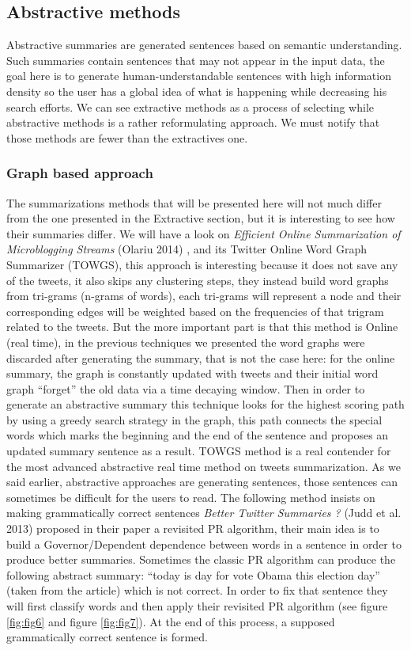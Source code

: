 \documentclass{llncs}
\begin{document}
\subsection{Abstractive methods}

Abstractive summaries are generated sentences based on semantic understanding.
Such summaries contain sentences that may not appear in the input data, the
goal here is to generate human-understandable sentences with high information
density so the user has a global idea of what is happening while decreasing his
search efforts. We can see extractive methods as a process of selecting while
abstractive methods is a rather reformulating approach. We must notify that
those methods are fewer than the extractives one.

\subsubsection{Graph based approach}

The summarizations methods that will be presented here will not much differ
from the one presented in the Extractive section, but it is interesting to see
how their summaries differ. We will have a look on \textit{Efficient Online
Summarization of Microblogging Streams} (Olariu 2014)
\cite{olariu_efficient_2014}, and its Twitter Online Word Graph Summarizer
(TOWGS), this approach is interesting because it does not save any of the
tweets, it also skips any clustering steps, they instead build word graphs from
tri-grams (n-grams of words), each tri-grams will represent a node and their
corresponding edges will be weighted based on the frequencies of that trigram
related to the tweets. But the more important part is that this method is
Online (real time), in the previous techniques we presented the word graphs
were discarded after generating the summary, that is not the case here: for the
online summary, the graph is constantly updated with tweets and their initial
word graph ``forget'' the old data via a time decaying window. Then in order to
generate an abstractive summary this technique looks for the highest scoring
path by using a greedy search strategy in the graph, this path connects the
special words which marks the beginning and the end of the sentence and
proposes an updated summary sentence as a result. TOWGS method is a real
contender for the most advanced abstractive real time method on tweets
summarization. As we said earlier, abstractive approaches are generating
sentences, those sentences can sometimes be difficult for the users to read.
The following method insists on making grammatically correct sentences
\textit{Better Twitter Summaries ?} (Judd et al. 2013) \cite{judd_better_2013}
proposed in their paper a revisited PR algorithm, their main idea is to build a
Governor/Dependent dependence between words in a sentence in order to produce
better summaries. Sometimes the classic PR algorithm can produce the following
abstract summary: ``today is day for vote Obama this election day'' (taken
from the article) which is not correct. In order to fix that sentence they will
first classify words and then apply their revisited PR algorithm (see figure
\ref{fig:fig6} and figure \ref{fig:fig7}). At the end of this process, a supposed
grammatically correct sentence is formed.
\end{document}
